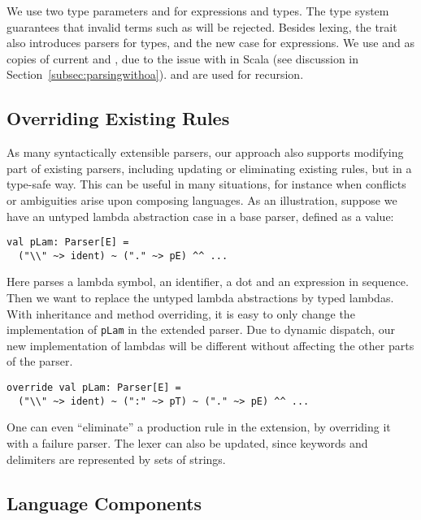 We use two type parameters  and  for expressions and types. The type system guarantees that invalid terms such as  will be rejected.
Besides lexing, the trait  also introduces parsers for types, and the new case for expressions.
We use  and  as copies of current  and , due to the issue
with  in Scala (see discussion in Section~\ref{subsec:parsingwithoa}).  and  are used for recursion.

\subsection{Overriding Existing Rules}\label{subsec:overriding-rules}

As many syntactically extensible parsers, our approach also supports
modifying part of existing parsers, including updating or eliminating existing rules,
but in a type-safe way. This can be useful in many
situations, for instance when conflicts or ambiguities arise upon composing languages.
As an illustration, suppose we have an untyped lambda abstraction case in a base parser, defined as a value:
\vspace{-4pt}
\begin{lstlisting}
val pLam: Parser[E] =
  ("\\" ~> ident) ~ ("." ~> pE) ^^ ...
\end{lstlisting}
\vspace{-4pt}
Here  parses a lambda symbol, an identifier, a dot and an expression in sequence.
Then we want to replace the untyped lambda abstractions by typed
lambdas. With inheritance and method overriding, it is easy to only
change the implementation of \lstinline{pLam} in the extended parser.
Due to dynamic dispatch, our new
implementation of lambdas will be different without affecting the other parts of the parser.
\begin{lstlisting}
override val pLam: Parser[E] =
  ("\\" ~> ident) ~ (":" ~> pT) ~ ("." ~> pE) ^^ ...
\end{lstlisting}


One can even ``eliminate'' a production rule in the extension, by overriding it with a failure parser. The lexer can also be updated, since keywords and delimiters are represented by sets of strings.


\subsection{Language Components}\label{subsec:language-component}

